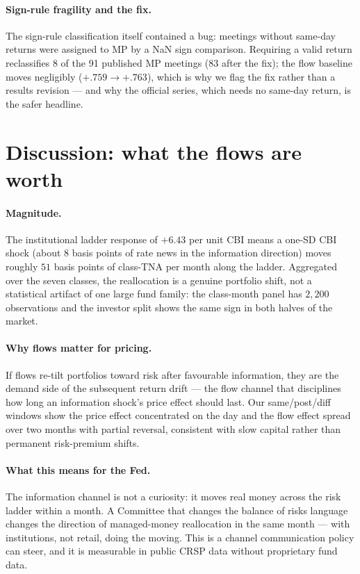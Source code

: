 \documentclass[11pt]{article}
\begin{document}
\paragraph{Sign-rule fragility and the fix.} The sign-rule classification
itself contained a bug: meetings without same-day returns were assigned to
MP by a NaN sign comparison. Requiring a valid return reclassifies 8 of the
91 published MP meetings ($83$ after the fix); the flow baseline moves
negligibly ($+.759 \to +.763$), which is why we flag the fix rather than a
results revision --- and why the official series, which needs no same-day
return, is the safer headline.

\section{Discussion: what the flows are worth}\label{sec:discussion}

\paragraph{Magnitude.} The institutional ladder response of $+6.43$ per
unit CBI means a one-SD CBI shock (about $8$ basis points of rate news in
the information direction) moves roughly $51$ basis points of class-TNA
per month along the ladder. Aggregated over the seven classes, the
reallocation is a genuine portfolio shift, not a statistical artifact of
one large fund family: the class-month panel has $2{,}200$ observations and
the investor split shows the same sign in both halves of the market.

\paragraph{Why flows matter for pricing.} If flows re-tilt portfolios
toward risk after favourable information, they are the demand side of the
subsequent return drift --- the flow channel that disciplines how long an
information shock's price effect should last. Our same/post/diff windows
show the price effect concentrated on the day and the flow effect spread
over two months with partial reversal, consistent with slow capital rather
than permanent risk-premium shifts.

\paragraph{What this means for the Fed.} The information channel is not a
curiosity: it moves real money across the risk ladder within a month. A
Committee that changes the balance of risks language changes the direction
of managed-money reallocation in the same month --- with institutions, not
retail, doing the moving. This is a channel communication policy can steer,
and it is measurable in public CRSP data without proprietary fund data.
\end{document}
